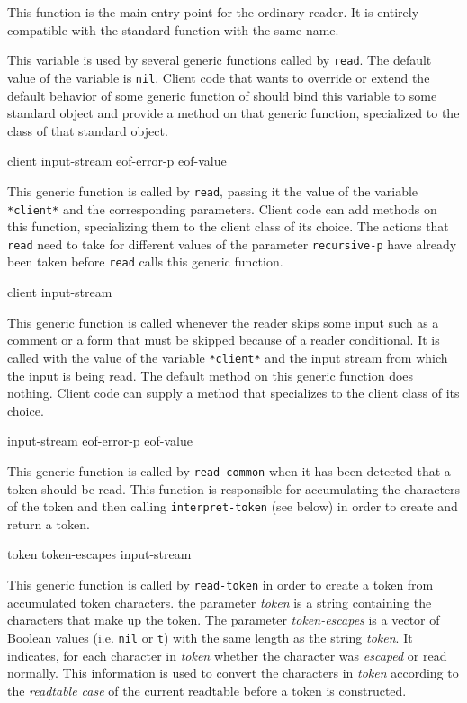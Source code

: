 This function is the main entry point for the ordinary reader.  It is
entirely compatible with the standard \commonlisp{} function with the
same name.


This variable is used by several generic functions called by
\texttt{read}.  The default value of the variable is \texttt{nil}.
Client code that wants to override or extend the default behavior of
some generic function of \sysname{} should bind this variable to some
standard object and provide a method on that generic function,
specialized to the class of that standard object.

 {client input-stream eof-error-p eof-value}

This generic function is called by \texttt{read}, passing it the value
of the variable \texttt{*client*} and the corresponding parameters.
Client code can add methods on this function, specializing them to the
client class of its choice.  The actions that \texttt{read} need to
take for different values of the parameter \texttt{recursive-p} have
already been taken before \texttt{read} calls this generic function.

 {client input-stream}

This generic function is called whenever the reader skips some input
such as a comment or a form that must be skipped because of a reader
conditional.  It is called with the value of the variable
\texttt{*client*} and the input stream from which the input is being
read.  The default method on this generic function does nothing.
Client code can supply a method that specializes to the client class
of its choice.

 {input-stream eof-error-p eof-value}

This generic function is called by \texttt{read-common} when it has
been detected that a token should be read.  This function is
responsible for accumulating the characters of the token and then
calling \texttt{interpret-token} (see below) in order to create and
return a token.

 {token token-escapes input-stream}

This generic function is called by \texttt{read-token} in order to
create a token from accumulated token characters.  the parameter
\textit{token} is a string containing the characters that make up the
token.  The parameter \textit{token-escapes} is a vector of Boolean
values (i.e. \texttt{nil} or \texttt{t}) with the same length as the
string \textit{token}.  It indicates, for each character in
\textit{token} whether the character was \emph{escaped} or read
normally.  This information is used to convert the characters in
\textit{token} according to the \emph{readtable case} of the current
readtable before a token is constructed.

